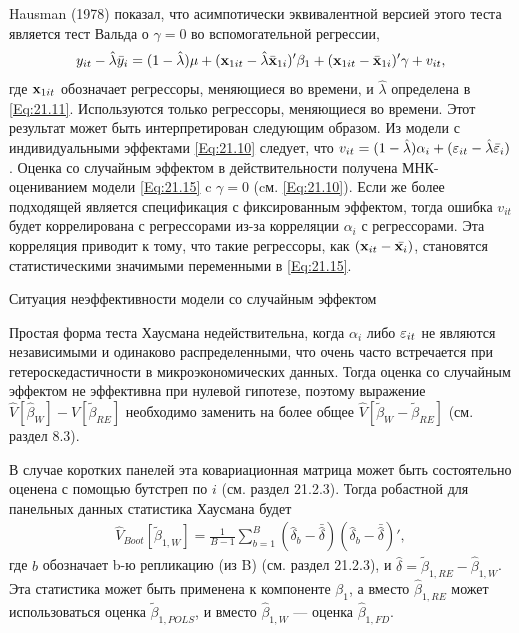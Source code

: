 Hausman (1978) показал, что асимпотически эквивалентной версией этого теста является тест Вальда о $\gamma=0$ во вспомогательной регрессии,
\begin{align}
y_{it}-\hat{\lambda}\bar{y}_i=(1-\hat{\lambda})\mu + (\mathbf{x}_{1it}-\hat{\lambda}\bar{\mathbf{x}}_{1i})'\beta_1+(\mathbf{x}_{1it}-\bar{\mathbf{x}}_{1i})'\gamma+v_{it},
\label{Eq:21.15}
\end{align}
где $\mathbf{x}_{1it}$ обозначает регрессоры, меняющиеся во времени, и $\hat{\lambda}$ определена в \ref{Eq:21.11}. Используются только регрессоры, меняющиеся во времени. Этот результат может быть интерпретирован следующим образом. Из модели с индивидуальными эффектами \ref{Eq:21.10} следует, что $v_{it}=(1-\hat{\lambda})\alpha_i+(\varepsilon_{it}-\hat{\lambda}\bar{\varepsilon}_i)$. Оценка со случайным эффектом в действительности получена МНК-оцениванием модели \ref{Eq:21.15} c $\gamma=0$ (cм. \ref{Eq:21.10}). Если же более подходящей является спецификация с фиксированным эффектом, тогда ошибка $v_{it}$ будет коррелирована с регрессорами из-за корреляции $\alpha_i$ с регрессорами. Эта корреляция приводит к тому, что такие регрессоры, как $(\mathbf{x}_{it}-\bar{\mathbf{x}_i})$, становятся статистическими значимыми переменными в \ref{Eq:21.15}.

{\centering
Ситуация неэффективности модели со случайным эффектом\\}

Простая форма теста Хаусмана недействительна, когда $\alpha_i$ либо $\varepsilon_{it}$ не являются независимыми и одинаково распределенными, что очень часто встречается при гетероскедастичности в микроэкономических данных. Тогда оценка со случайным эффектом не эффективна при нулевой гипотезе, поэтому выражение $\hat{V}[\hat{\beta}_W]-\hat{V}[\tilde{\beta}_{RE}]$ необходимо заменить на более общее $\hat{V}[\tilde{\beta}_W-\tilde{\beta}_{RE}]$ (см. раздел 8.3).

В случае коротких панелей эта ковариационная матрица может быть состоятельно оценена с помощью бутстреп по $i$ (см. раздел 21.2.3). Тогда робастной для панельных данных статистика Хаусмана будет
\begin{align}
\hat{V}_{Boot}[\tilde{\beta}_{1,W}]=\frac{1}{B-1} \sum^B_{b=1} 
\left(\hat{\delta}_b-\bar{\hat{\delta}}\right)
\left(\hat{\delta}_b-\bar{\hat{\delta}}\right)',
\end{align}
где $b$ обозначает b-ю репликацию (из B) (см. раздел 21.2.3), и $\hat{\delta}=\tilde{\beta}_{1,RE}-\hat{\beta}_{1,W}$. Эта статистика может быть применена к компоненте $\beta_1$, а вместо $\hat{\beta}_{1,RE}$ может использоваться  оценка $\tilde{\beta}_{1,POLS}$, и вместо  $\hat{\beta}_{1,W}$ --- оценка $\hat{\beta}_{1,FD}$.

